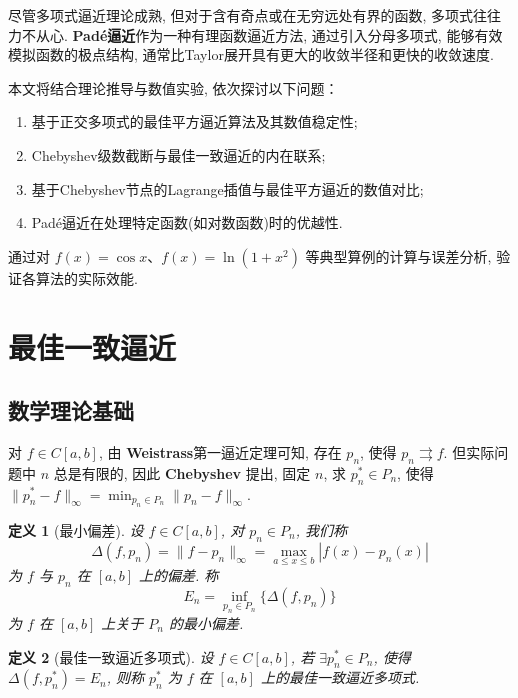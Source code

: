 \documentclass[UTF8, a4paper, 11pt]{ctexart}
\newtheorem{definition}{定义}[section]
\begin{document}
尽管多项式逼近理论成熟, 但对于含有奇点或在无穷远处有界的函数, 多项式往往力不从心. \textbf{Padé逼近}作为一种有理函数逼近方法, 通过引入分母多项式, 能够有效模拟函数的极点结构, 通常比Taylor展开具有更大的收敛半径和更快的收敛速度. 

本文将结合理论推导与数值实验, 依次探讨以下问题：
\begin{enumerate}
    \item 基于正交多项式的最佳平方逼近算法及其数值稳定性; 
    \item Chebyshev级数截断与最佳一致逼近的内在联系; 
    \item 基于Chebyshev节点的Lagrange插值与最佳平方逼近的数值对比; 
    \item Padé逼近在处理特定函数(如对数函数)时的优越性. 
\end{enumerate}
通过对 $f(x)=\cos x$、$f(x)=\ln(1+x^2)$ 等典型算例的计算与误差分析, 验证各算法的实际效能. 

\section{最佳一致逼近}
\subsection{数学理论基础}
对 $ f \in C[a, b] $, 由 \textbf{Weistrass}第一逼近定理可知, 存在 $ p_n $, 使得 $ p_n \rightrightarrows f $. 但实际问题中 $ n $ 总是有限的, 因此 \textbf{Chebyshev} 提出, 固定 $ n $, 求 $ p_n^* \in P_n $, 使得 $ \| p_n^* - f \|_{\infty} = \min_{p_n \in P_n} \| p_n - f \|_{\infty} $.
\begin{definition}[最小偏差]
    设 $ f \in C[a, b] $, 对 $ p_n \in P_n $, 我们称
\[ \Delta(f, p_n) = \| f - p_n \|_{\infty} = \max_{a \leq x \leq b} | f(x) - p_n(x) | \]
为 $ f $ 与 $ p_n $ 在 $[a, b]$ 上的偏差. 称
\[ E_n = \inf_{p_n \in P_n} \{ \Delta(f, p_n) \} \]
为 $ f $ 在 $[a, b]$ 上关于 $ P_n $ 的最小偏差.
\end{definition}
\begin{definition}[最佳一致逼近多项式]
    设 $ f \in C[a, b] $, 若 $ \exists p_n^* \in P_n $, 使得 $ \Delta(f, p_n^*) = E_n $, 则称 $ p_n^* $ 为 $ f $ 在 $[a, b]$ 上的最佳一致逼近多项式.
\end{definition}
\end{document}
